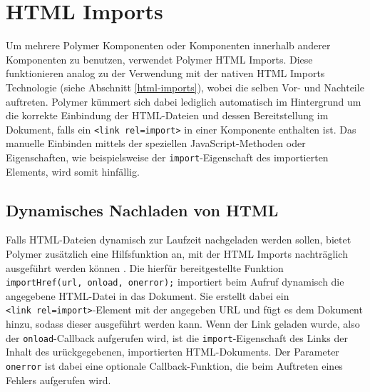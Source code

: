 


\newpage
\section{HTML Imports}\label{polymer-html-imports}

Um mehrere Polymer Komponenten oder Komponenten innerhalb anderer Komponenten zu benutzen, verwendet Polymer \ac{HTML} Imports. Diese funktionieren analog zu der Verwendung mit der nativen \ac{HTML} Imports Technologie (siehe Abschnitt \ref{html-imports}), wobei die selben Vor- und Nachteile auftreten. Polymer kümmert sich dabei lediglich automatisch im Hintergrund um die korrekte Einbindung der \ac{HTML}-Dateien und dessen Bereitstellung im Dokument, falls ein \texttt{\textless{}link\ rel=\dq import\dq\textgreater{}} in einer Komponente enthalten ist. Das manuelle Einbinden mittels der speziellen JavaScript-Methoden oder Eigenschaften, wie beispielsweise der \texttt{import}-Eigenschaft des importierten Elements, wird somit hinfällig.

\subsection{Dynamisches Nachladen von HTML}\label{dynamisches-nachladen-von-html}

Falls \ac{HTML}-Dateien dynamisch zur Laufzeit nachgeladen werden sollen, bietet Polymer zusätzlich eine Hilfsfunktion an, mit der \ac{HTML} Imports nachträglich ausgeführt werden können \cite{citeulike:13914840}. Die hierfür bereitgestellte Funktion \texttt{importHref(url,\ onload,\ onerror);} importiert beim Aufruf dynamisch die angegebene \ac{HTML}-Datei in das Dokument. Sie erstellt dabei ein \texttt{\textless{}link\ rel=\dq import\dq\textgreater{}}-Element mit der angegeben URL und fügt es dem Dokument hinzu, sodass dieser ausgeführt werden kann. Wenn der Link geladen wurde, also der \texttt{onload}-Callback aufgerufen wird, ist die \texttt{import}-Eigenschaft des Links der Inhalt des  urückgegebenen, importierten \ac{HTML}-Dokuments. Der Parameter \texttt{onerror} ist dabei eine optionale Callback-Funktion, die beim Auftreten eines Fehlers aufgerufen wird.

